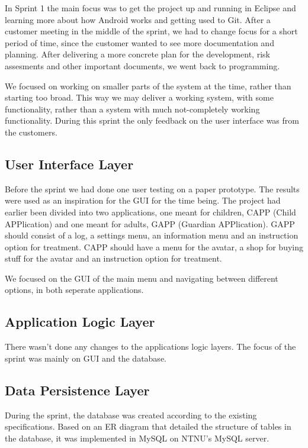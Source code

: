 In Sprint 1 the main focus was to get the project up and running in Eclipse
and learning more about how Android works and getting used to Git. After a customer meeting in the middle of
the sprint, we had to change focus for a short period of time, since the customer
wanted to see more documentation and planning. After delivering a more concrete plan for the development, risk assesments and other important documents, we went back to programming.

We focused on working on smaller parts of the system at the time, rather than
starting too broad. This way we may deliver a working system, with some
functionality, rather than a system with much not-completely working functionality.
During this sprint the only feedback on the user interface was from the customers.

\subsection{User Interface Layer}
Before the sprint we had done one user testing on a paper prototype. The results were
used as an inspiration for the GUI for the time being. The project had earlier been divided
into two applications, one meant for children, CAPP (Child APPlication) and one meant for
adults, GAPP (Guardian APPlication). GAPP should consist of a log, a settings menu, an
information menu and an instruction option for treatment. CAPP should have a menu for the
avatar, a shop for buying stuff for the avatar and an instruction option for treatment.

We focused on the GUI of the main menu and navigating between different options, in both seperate
applications.

\subsection{Application Logic Layer}
There wasn't done any changes to the applications logic layers. The focus of the
sprint was mainly on GUI and the database.

\subsection{Data Persistence Layer}
During the sprint, the database was created according to the existing specifications. Based
on an ER diagram that detailed the structure of tables in the database, it was implemented
in MySQL on NTNU's MySQL server.

